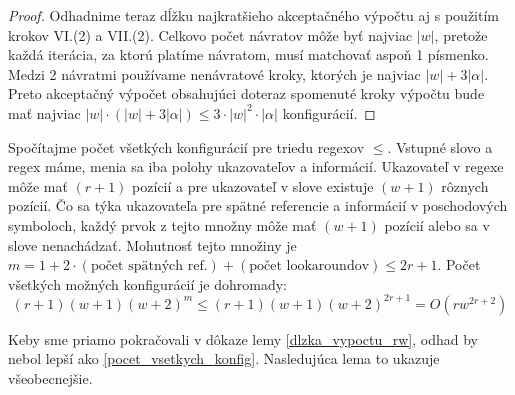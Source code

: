 \begin{proof}
Odhadnime teraz dĺžku najkratšieho akceptačného výpočtu aj s použitím krokov VI.(2) a VII.(2). Celkovo počet návratov môže byť najviac $|w|$, pretože každá iterácia, za ktorú platíme návratom, musí matchovať aspoň 1 písmenko. Medzi 2 návratmi používame nenávratové kroky, ktorých je najviac $|w|+3|\alpha|$. Preto akceptačný výpočet obsahujúci doteraz spomenuté kroky výpočtu bude mať najviac $|w|\cdot(|w|+3|\alpha|) \leq 3\cdot|w|^2\cdot|\alpha|$ konfigurácií.
\end{proof}

Spočítajme počet všetkých konfigurácií pre triedu regexov $\le$. Vstupné slovo a regex máme, menia sa iba polohy ukazovateľov a informácií. Ukazovateľ v regexe môže mať $(r+1)$ pozícií a pre ukazovateľ v slove existuje $(w+1)$ rôznych pozícií. Čo sa týka ukazovateľa pre spätné referencie a informácií v poschodových symboloch, každý prvok z tejto množny môže mať $(w+1)$ pozícií alebo sa v slove nenachádzať. Mohutnosť tejto množiny je $m = 1+2\cdot(\text{počet spätných ref.})+(\text{počet lookaroundov})\leq 2r+1$. Počet všetkých možných konfigurácií je dohromady: 
\begin{equation}\label{pocet_vsetkych_konfig}
(r+1)(w+1)(w+2)^m \leq (r+1)(w+1)(w+2)^{2r+1} = O(rw^{2r+2})
\end{equation}

Keby sme priamo pokračovali v dôkaze lemy \ref{dlzka_vypoctu_rw}, odhad by nebol lepší ako \ref{pocet_vsetkych_konfig}. Nasledujúca lema to ukazuje všeobecnejšie.

